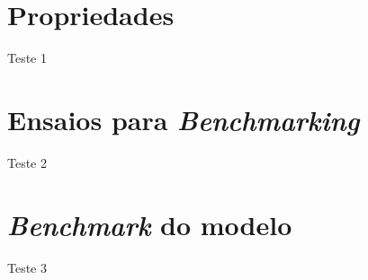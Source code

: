 \section{Propriedades}
Teste 1 

\section{Ensaios para \textit{Benchmarking}}
Teste 2

\section{\textit{Benchmark} do modelo}
Teste 3 


